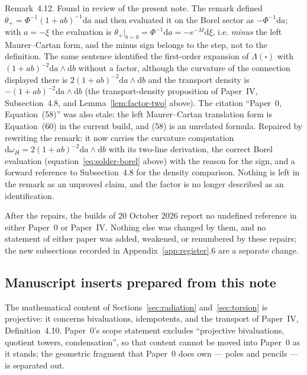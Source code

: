 \begin{enumerate}[label=(\alph*)]
{  Remark~4.12.}  Found in review of the present note.  The remark defined
  $\theta_+=\Phi^{-1}(1+ab)^{-1}\mathrm da$ and then evaluated it on the Borel
  sector as $-\Phi^{-1}\mathrm da$; with $a=-\xi$ the evaluation is
  $\theta_+|_{b=0}=\Phi^{-1}\mathrm da=-e^{-M}\mathrm d\xi$, i.e. \emph{minus}
  the left Maurer--Cartan form, and the minus sign belongs to the step, not to
  the definition.  The same sentence identified the first-order expansion of
  $\Lambda(\square)$ with $(1+ab)^{-2}\mathrm da\wedge\mathrm db$ without a
  factor, although the curvature of the connection displayed there is
  $2(1+ab)^{-2}\mathrm da\wedge\mathrm db$ and the transport density is
  $-(1+ab)^{-2}\mathrm da\wedge\mathrm db$ (the transport-density proposition
  of Paper~IV, Subsection~4.8, and Lemma~\ref{lem:factor-two} above).  The citation ``Paper~0, Equation~(58)'' was also
  stale: the left Maurer--Cartan translation form is Equation~(60) in the
  current build, and (58) is an unrelated formula.  Repaired by rewriting the
  remark: it now carries the curvature computation
  $\mathrm d\omega_H=2(1+ab)^{-2}\mathrm da\wedge\mathrm db$ with its two-line
  derivation, the correct Borel evaluation
  (equation~\eqref{eq:solder-borel} above) with the reason for the sign, and a
  forward reference to Subsection~4.8 for the density comparison.  Nothing is left in the remark
  as an unproved claim, and the factor is no longer described as an
  identification.
\end{enumerate}

After the repairs, the builds of 20 October 2026 report no undefined reference
in either Paper~0 or Paper~IV.  Nothing else was changed by them, and no
statement of either paper was added, weakened, or renumbered by these repairs;
the new subsections recorded in Appendix~\ref{app:register}.6 are a separate
change.

\subsection{Manuscript inserts prepared from this note}

The mathematical content of Sections~\ref{sec:radiation}
and~\ref{sec:torsion} is projective: it concerns bivaluations, idempotents, and
the transport of Paper~IV, Definition~4.10.  Paper~0's scope statement excludes
``projective bivaluations, quotient towers, condensation'', so that content
cannot be moved into Paper~0 as it stands; the geometric fragment that Paper~0
does own --- poles and pencils --- is separated out.

